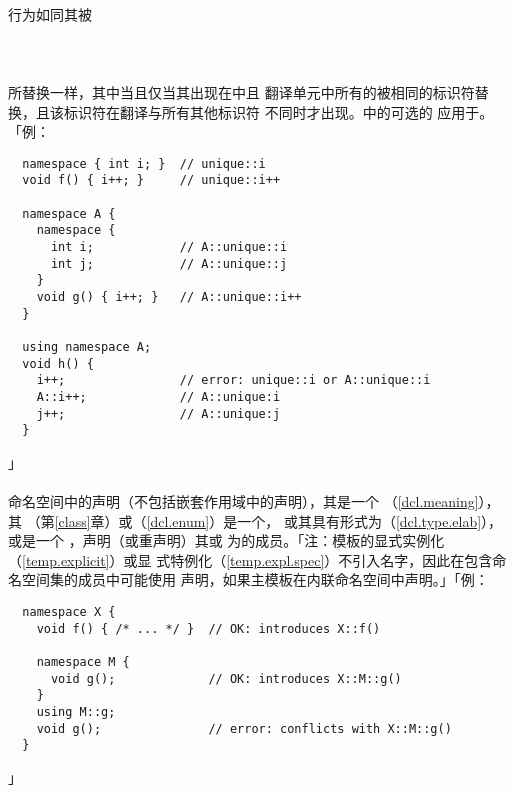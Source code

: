 \paragraph{}
行为如同其被                                 \\
\mbox{\qquad{}   }                                                       \\
\mbox{\qquad{}  \tm{;}}                          \\
\mbox{\qquad{}  \tm{\{} 
  \tm{\}}}                                                                    \\
所替换一样，其中当且仅当其出现在中且
翻译单元中所有的被相同的标识符替换，且该标识符在翻译与所有其他标识符
不同时才出现。中的可选的
应用于。「例：
\begin{lstlisting}
  namespace { int i; }  // unique::i
  void f() { i++; }     // unique::i++

  namespace A {
    namespace {
      int i;            // A::unique::i
      int j;            // A::unique::j
    }
    void g() { i++; }   // A::unique::i++
  }

  using namespace A;
  void h() {
    i++;                // error: unique::i or A::unique::i
    A::i++;             // A::unique:i
    j++;                // A::unique:j
  }
\end{lstlisting}」

\paragraph{}
命名空间中的声明（不包括嵌套作用域中的声明），其是一个
（\ref{dcl.meaning}），其
（第\ref{class}章）或（\ref{dcl.enum}）是一个，
或其具有形式为（\ref{dcl.type.elab}），或是一个
，声明（或重声明）其或
为的成员。「注：模板的显式实例化（\ref{temp.explicit}）或显
式特例化（\ref{temp.expl.spec}）不引入名字，因此在包含命名空间集的成员中可能使用
声明，如果主模板在内联命名空间中声明。」「例：
\begin{lstlisting}
  namespace X {
    void f() { /* ... */ }  // OK: introduces X::f()

    namespace M {
      void g();             // OK: introduces X::M::g()
    }
    using M::g;
    void g();               // error: conflicts with X::M::g()
  }
\end{lstlisting}」

